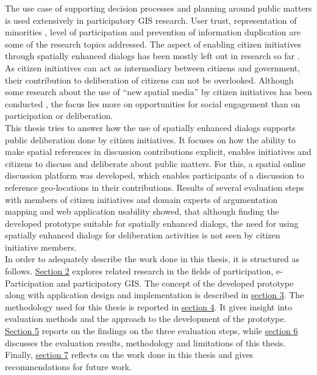 The use case of supporting decision processes and planning around public matters is used extensively in participatory GIS research. User trust, representation of minorities \cite{Carver2001_PPGIS_Cyberdemocracy}, level of participation \cite{Steinmann2005_Combination_Ladder_GIS} and prevention of information duplication \cite{Hopfer2007_Communication} are some of the research topics addressed. The aspect of enabling citizen initiatives through spatially enhanced dialogs has been mostly left out in research so far \cite{Cai2009_spatial_annotation_deliberation}. As citizen initiatives can act as intermediary between citizens and government, their contribution to deliberation of citizens can not be overlooked. Although some research about the use of ``new spatial media'' by citizen initiatives has been conducted \cite{Elwood2013_NewSpatialMedia}, the focus lies more on opportunities for social engagement than on participation or deliberation.\\
This thesis tries to answer how the use of spatially enhanced dialogs supports public deliberation done by citizen initiatives. It focuses on how the ability to make spatial references in discussion contributions explicit, enables initiatives and citizens to discuss and deliberate about public matters. For this, a spatial online discussion platform was developed, which enables participants of a discussion to reference geo-locations in their contributions. Results of several evaluation steps with members of citizen initiatives and domain experts of argumentation mapping and web application usability showed, that although finding the developed prototype suitable for spatially enhanced dialogs, the need for using spatially enhanced dialogs for deliberation activities is not seen by citizen initiative members.\\
In order to adequately describe the work done in this thesis, it is structured as follows. \hyperref[chap:related_work]{Section 2} explores related research in the fields of participation, e-Participation and participatory GIS. The concept of the developed prototype along with application design and implementation is described in \hyperref[chap:approach]{section 3}. The methodology used for this thesis is reported in \hyperref[chap:methodology]{section 4}. It gives insight into evaluation methods and the approach to the development of the prototype. \hyperref[chap:methodology]{Section 5} reports on the findings on the three evaluation steps, while \hyperref[chap:discussion]{section 6} discusses the evaluation results, methodology and limitations of this thesis. Finally, \hyperref[chap:conclusion]{section 7} reflects on the work done in this thesis and gives recommendations for future work.




